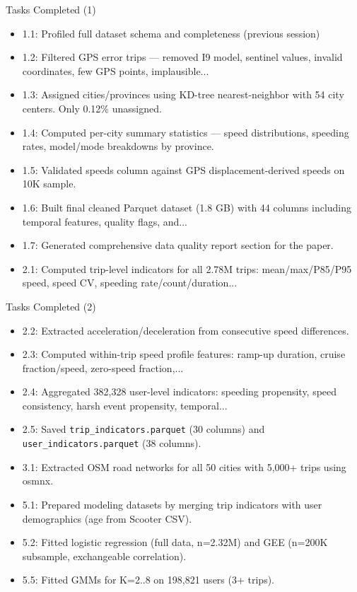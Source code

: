 \documentclass[aspectratio=169, 10pt]{beamer}
\begin{document}
\begin{frame}{Tasks Completed (1)}
\begin{itemize}\small
  \item 1.1: Profiled full dataset schema and completeness (previous session)
  \item 1.2: Filtered GPS error trips — removed I9 model, sentinel values, invalid coordinates, few GPS points, implausible...
  \item 1.3: Assigned cities/provinces using KD-tree nearest-neighbor with 54 city centers. Only 0.12\% unassigned.
  \item 1.4: Computed per-city summary statistics — speed distributions, speeding rates, model/mode breakdowns by province.
  \item 1.5: Validated speeds column against GPS displacement-derived speeds on 10K sample.
  \item 1.6: Built final cleaned Parquet dataset (1.8 GB) with 44 columns including temporal features, quality flags, and...
  \item 1.7: Generated comprehensive data quality report section for the paper.
  \item 2.1: Computed trip-level indicators for all 2.78M trips: mean/max/P85/P95 speed, speed CV, speeding rate/count/duration...
\end{itemize}
\end{frame}

\begin{frame}{Tasks Completed (2)}
\begin{itemize}\small
  \item 2.2: Extracted acceleration/deceleration from consecutive speed differences.
  \item 2.3: Computed within-trip speed profile features: ramp-up duration, cruise fraction/speed, zero-speed fraction,...
  \item 2.4: Aggregated 382,328 user-level indicators: speeding propensity, speed consistency, harsh event propensity, temporal...
  \item 2.5: Saved \texttt{trip\_indicators.parquet} (30 columns) and \texttt{user\_indicators.parquet} (38 columns).
  \item 3.1: Extracted OSM road networks for all 50 cities with 5,000+ trips using osmnx.
  \item 5.1: Prepared modeling datasets by merging trip indicators with user demographics (age from Scooter CSV).
  \item 5.2: Fitted logistic regression (full data, n=2.32M) and GEE (n=200K subsample, exchangeable correlation).
  \item 5.5: Fitted GMMs for K=2..8 on 198,821 users (3+ trips).
\end{itemize}
\end{frame}
\end{document}
